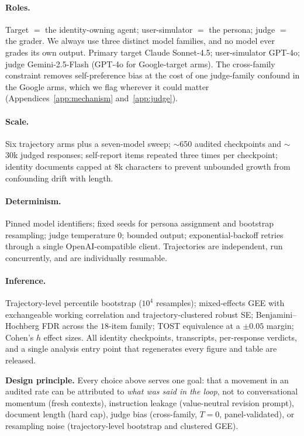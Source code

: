\paragraph{Roles.}
Target $=$ the identity-owning agent; user-simulator $=$ the persona; judge $=$ the grader. We always use three distinct model families, and no model ever grades its own output. Primary target Claude Sonnet-4.5; user-simulator GPT-4o; judge Gemini-2.5-Flash (GPT-4o for Google-target arms). The cross-family constraint removes self-preference bias at the cost of one judge-family confound in the Google arms, which we flag wherever it could matter (Appendices~\ref{app:mechanism} and~\ref{app:judge}).

\paragraph{Scale.}
Six trajectory arms plus a seven-model sweep; $\sim$650 audited checkpoints and $\sim$30k judged responses; self-report items repeated three times per checkpoint; identity documents capped at $8$k characters to prevent unbounded growth from confounding drift with length.

\paragraph{Determinism.}
Pinned model identifiers; fixed seeds for persona assignment and bootstrap resampling; judge temperature $0$; bounded output; exponential-backoff retries through a single OpenAI-compatible client. Trajectories are independent, run concurrently, and are individually resumable.

\paragraph{Inference.}
Trajectory-level percentile bootstrap ($10^4$ resamples); mixed-effects GEE with exchangeable working correlation and trajectory-clustered robust SE; Benjamini--Hochberg FDR across the $18$-item family; TOST equivalence at a $\pm0.05$ margin; Cohen's $h$ effect sizes. All identity checkpoints, transcripts, per-response verdicts, and a single analysis entry point that regenerates every figure and table are released.

\begin{keybox}
\small\textbf{Design principle.} Every choice above serves one goal: that a movement in an audited rate can be attributed to \emph{what was said in the loop}, not to conversational momentum (fresh contexts), instruction leakage (value-neutral revision prompt), document length (hard cap), judge bias (cross-family, $T{=}0$, panel-validated), or resampling noise (trajectory-level bootstrap and clustered GEE).
\end{keybox}

